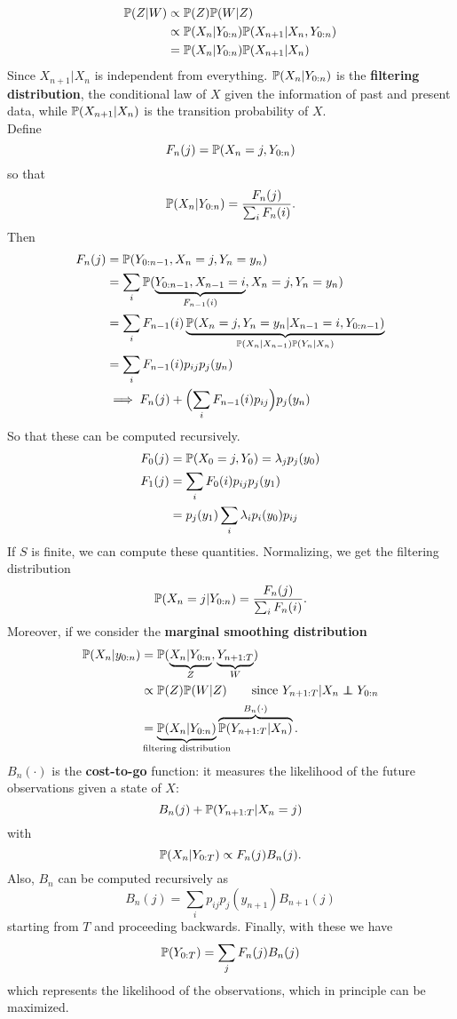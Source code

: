 \documentclass{article}
\begin{document}
	\begin{align*}
		\mathbb{P}(Z|W)&\propto\mathbb{P}(Z)\mathbb{P}(W|Z)\\
		&\propto\mathbb{P}(X_n|Y_{0:n})\mathbb{P}(X_{n+1}|X_n,Y_{0:n})\\
		&=\mathbb{P}(X_n|Y_{0:n})\mathbb{P}(X_{n+1}|X_n)
	\end{align*}
	Since $X_{n+1}|X_n$ is independent from everything. $\mathbb{P}(X_n|Y_{0:n})$ is the \textbf{filtering distribution}, the conditional law of $X$ given the information of past and present data, while $\mathbb{P}(X_{n+1}|X_n)$ is the transition probability of $X$. \\Define
	\[F_n(j)=\mathbb{P}(X_n=j,Y_{0:n})\] so that
	\[
	\mathbb{P}(X_n|Y_{0:n})=\frac{F_n(j)}{\sum_i F_n(i)}.
	\]
	Then
	\begin{align*}
		F_n(j)&=\mathbb{P}(Y_{0:n-1},X_n=j,Y_n=y_n)\\
		&=\sum_i\mathbb{P}(\underbrace{Y_{0:n-1},X_{n-1}=i}_{F_{n-1}(i)},X_n=j,Y_n=y_n)\\
		&=\sum_i F_{n-1}(i)\underbrace{\mathbb{P}(X_n=j,Y_n=y_n|X_{n-1}=i,Y_{0:n-1})}_{\mathbb{P}(X_n|X_{n-1})\mathbb{P}(Y_n|X_n)}\\
		&=\sum_i F_{n-1}(i)p_{ij}p_j(y_n)\\
		&\implies F_n(j)+\Bigl(\sum_iF_{n-1}(i)p_{ij}\Bigr)p_j(y_n)
	\end{align*}
	So that these can be computed recursively.
	\begin{align*}
		F_0(j)&=\mathbb{P}(X_0=j,Y_0)=\lambda_jp_j(y_0)\\
		F_1(j)&=\sum_i F_0(i)p_{ij}p_j(y_1)\\
		&=p_j(y_1)\sum_i\lambda_i p_i(y_0)p_{ij}
	\end{align*}
	If $S$ is finite, we can compute these quantities. Normalizing, we get the filtering distribution
	\[
	\mathbb{P}(X_n=j|Y_{0:n})=\frac{F_n(j)}{\sum_i F_n(i)}.
	\]
	Moreover, if we consider the \textbf{marginal smoothing distribution}
	\begin{align*}
		\prob(X_n|y_{0:n})&=\prob(\underbrace{X_n|Y_{0:n}}_{Z},\underbrace{Y_{n+1:T}}_{W})\\
		&\propto\prob(Z)\prob(W|Z)\qquad\text{since }Y_{n+1:T}|X_n \independent Y_{0:n}\\
		&=\underbrace{\prob(X_n|Y_{0:n})}_{\mathclap{\text{filtering distribution}}}\overbrace{\prob(Y_{n+1:T}|X_n)}^{\mathclap{B_n(\cdot)}}.
	\end{align*}
	$B_n(\cdot)$ is the \textbf{cost-to-go} function: it measures the likelihood of the future observations given a state of $X$:
	\[B_n(j)+\mathbb{P}(Y_{n+1:T}|X_n=j)\]
	with
	\[
	\mathbb{P}(X_n|Y_{0:T})\propto F_n(j)B_n(j).
	\]
	Also, $B_n$ can be computed recursively as
	\[B_n(j)=\sum_i p_{ij}p_{j}(y_{n+1})B_{n+1}(j)\]
	starting from $T$ and proceeding backwards. Finally, with these we have
	\[
	\mathbb{P}(Y_{0:T})=\sum_jF_n(j)B_n(j)
	\]
	which represents the likelihood of the observations, which in principle can be maximized.
\end{document}
